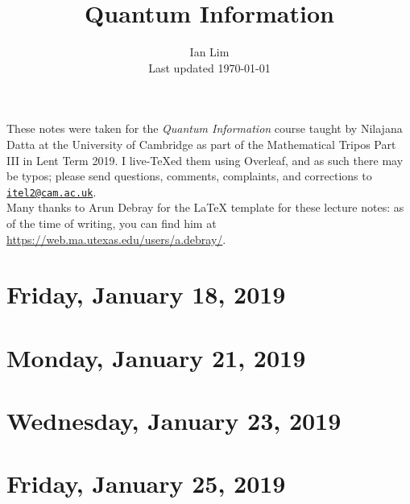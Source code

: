 \documentclass[reqno]{amsart}
\begin{document}
\title{Quantum Information}
\author{Ian Lim\\ Last updated \today}
\maketitle
{\small\noindent These notes were taken for the \textit{Quantum Information} course taught by Nilajana Datta at the University of Cambridge as part of the Mathematical Tripos Part III in Lent Term 2019. I live-\TeX ed them using Overleaf, and as such there may be typos; please send questions, comments, complaints, and corrections to 
\href{mailto:itel2@cam.ac.uk?subject=QI\%20Lecture\%20Notes}{\texttt{itel2@cam.ac.uk}}.\\
Many thanks to Arun Debray for the {\LaTeX} template for these lecture notes: as of the time of writing, you can find him at \url{https://web.ma.utexas.edu/users/a.debray/}.}

\tableofcontents

\section{Friday, January 18, 2019}
	

\section{Monday, January 21, 2019}  
    

\section{Wednesday, January 23, 2019}
    

\section{Friday, January 25, 2019}
    
\end{document}

